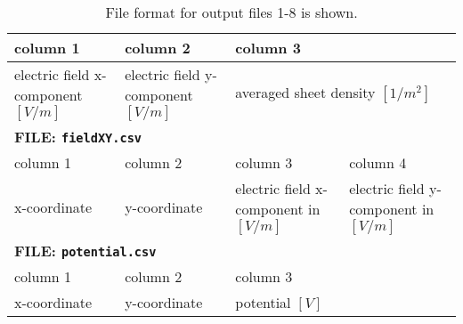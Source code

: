 \begin{table}[ht!]
\begin{tabular}{|m{2.7cm}|m{2.7cm}|m{2.7cm}|m{2.7cm}|m{2.7cm}|}
\hline
  column 1 & column 2 & \multicolumn{3}{|l|}{column 3}  \\
\hline
  electric field x-component $[V/m]$ & electric field y-component $[V/m]$ & \multicolumn{3}{|l|}{averaged sheet density $[1/m^2]$} \\
\hline \hline
  \multicolumn{5}{|l|}{\textbf{FILE: \texttt{fieldXY.csv}}} \\
\hline
  column 1 & column 2 & column 3 & \multicolumn{2}{|l|}{column 4} \\
\hline
  x-coordinate & y-coordinate & electric field x-component in $[V/m]$ & \multicolumn{2}{|l|}{electric field y-component in $[V/m]$} \\
\hline \hline
  \multicolumn{5}{|l|}{\textbf{FILE: \texttt{potential.csv}}} \\
\hline
  column 1 & column 2 & \multicolumn{3}{|l|}{column 3}  \\
\hline
  x-coordinate & y-coordinate & \multicolumn{3}{|l|}{potential $[V]$} \\
\hline
\end{tabular}
\caption{File format for output files 1-8 is shown.}
\label{tab:fileformat}
\end{table}



